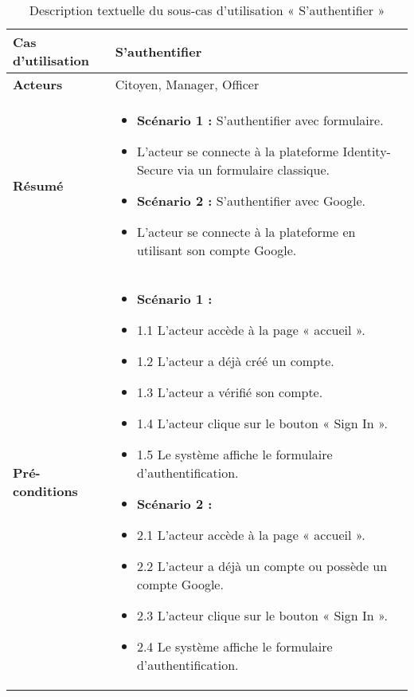 \begin{longtable}{|>{\arraybackslash}p{4.2cm}|>{\arraybackslash}p{12.5cm}|}
\caption{\centering Description textuelle du sous-cas d'utilisation « S'authentifier »}
\label{tab:backlog:ch2:3} \\
\hline
\rowcolor{gray!30}
\textbf{Cas d'utilisation} & S'authentifier \\
\hline
\endfirsthead

\hline
\endhead

\hline
\endfoot

\hline \hline
\endlastfoot

\textbf{Acteurs} & Citoyen, Manager, Officer \\
\hline

\textbf{Résumé} &
\begin{itemize}[label=]
  \item \textbf{Scénario 1 :} S'authentifier avec formulaire.
  \item L'acteur se connecte à la plateforme Identity-Secure via un formulaire classique.
  \item \textbf{Scénario 2 :} S'authentifier avec Google.
  \item L'acteur se connecte à la plateforme en utilisant son compte Google.
\end{itemize} \\
\hline

\textbf{Pré-conditions} &
\begin{itemize}[label=]
  \item \textbf{Scénario 1 :}
  \item 1.1 L'acteur accède à la page « accueil ».
    \item 1.2 L'acteur a déjà créé un compte.
    \item 1.3 L'acteur a vérifié son compte.
    \item 1.4 L'acteur clique sur le bouton « Sign In ».
    \item 1.5 Le système affiche le formulaire d'authentification.

  \item \textbf{Scénario 2 :}
    \item 2.1 L'acteur accède à la page « accueil ».
    \item 2.2 L'acteur a déjà un compte ou possède un compte Google.
    \item 2.3 L'acteur clique sur le bouton « Sign In ».
    \item 2.4 Le système affiche le formulaire d'authentification.
\end{itemize} \\
\hline


\end{longtable}
